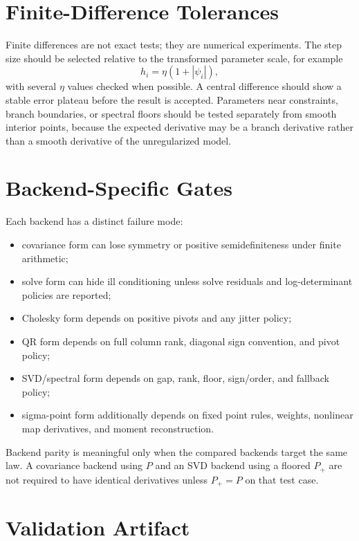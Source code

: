 \section{Finite-Difference Tolerances}
\label{sec:bf-validation-finite-difference-tolerances}

Finite differences are not exact tests; they are numerical experiments.  The
step size should be selected relative to the transformed parameter scale, for
example
\[
  h_i = \eta(1+|\psi_i|),
\]
with several $\eta$ values checked when possible.  A central difference should
show a stable error plateau before the result is accepted.  Parameters near
constraints, branch boundaries, or spectral floors should be tested separately
from smooth interior points, because the expected derivative may be a branch
derivative rather than a smooth derivative of the unregularized model.

\section{Backend-Specific Gates}
\label{sec:bf-validation-backend-gates}

Each backend has a distinct failure mode:
\begin{itemize}
  \item covariance form can lose symmetry or positive semidefiniteness under
    finite arithmetic;
  \item solve form can hide ill conditioning unless solve residuals and
    log-determinant policies are reported;
  \item Cholesky form depends on positive pivots and any jitter policy;
  \item QR form depends on full column rank, diagonal sign convention, and
    pivot policy;
  \item SVD/spectral form depends on gap, rank, floor, sign/order, and fallback
    policy;
  \item sigma-point form additionally depends on fixed point rules, weights,
    nonlinear map derivatives, and moment reconstruction.
\end{itemize}
Backend parity is meaningful only when the compared backends target the same
law.  A covariance backend using $P$ and an SVD backend using a floored $P_+$ are
not required to have identical derivatives unless $P_+=P$ on that test case.

\section{Validation Artifact}
\label{sec:bf-validation-artifact}

